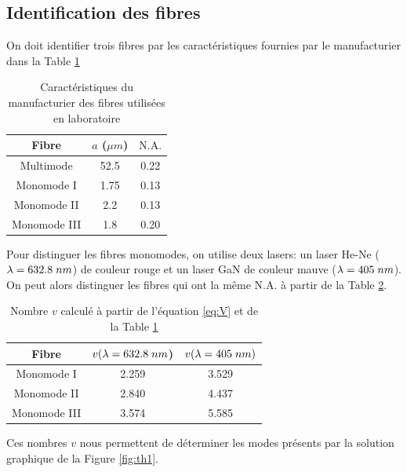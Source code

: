 \documentclass[10pt,letterpaper,twocolumn]{article}
\newcommand{\s}{\hspace{0.1cm}}
\newcommand{\na}{\text{N.A.}}
\begin{document}
\subsection{Identification des fibres}\label{sec:IndentificationFibre}
On doit identifier trois fibres par les caractéristiques fournies par le manufacturier dans la Table \ref{tab:Manuf} 
\begin{table}[H]
	\centering
	\caption{Caractéristiques du manufacturier des fibres utilisées en laboratoire}
	\label{tab:Manuf}
	\begin{tabular}{|c|c|c|}
	\hline
		Fibre & $a$ ($\mu m$) & $\na$ \\\hline
		Multimode & 52.5 & 0.22 \\\hline
		Monomode I & 1.75 & 0.13 \\\hline
		Monomode II & 2.2 & 0.13 \\\hline
		Monomode III & 1.8 & 0.20\\\hline
	\end{tabular}
\end{table}
Pour distinguer les fibres monomodes, on utilise deux lasers: un laser He-Ne ($\lambda = 632.8\s nm$) de couleur rouge et un laser GaN de couleur mauve ($\lambda=405\s nm$). On peut alors distinguer les fibres qui ont la même $\na$ à partir de la Table \ref{tab:VNumber}.
\begin{table}[H]
	\centering
	\caption{Nombre $v$ calculé à partir de l'équation \eqref{eq:V} et de la Table \ref{tab:Manuf}}
	\label{tab:VNumber}
	\begin{tabular}{|c|c|c|}
	\hline
			Fibre & $v(\lambda = 632.8\s nm$) & $v(\lambda=405\s nm)$ \\\hline
			Monomode I & 2.259 & 3.529 \\\hline
			Monomode II & 2.840 & 4.437 \\\hline
			Monomode III &  3.574 &  5.585\\\hline
	\end{tabular}
\end{table}
 Ces nombres $v$ nous permettent de déterminer les modes présents par la solution graphique de la Figure \ref{fig:th1}. 
\end{document}
